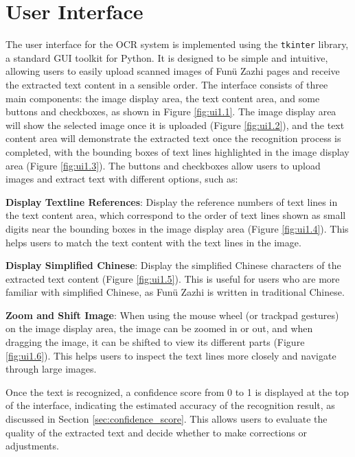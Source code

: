 \documentclass[12pt,twoside]{report}
\begin{document}
\section{User Interface}
\label{sec:user_interface}
The user interface for the OCR system is implemented using the \texttt{tkinter} library, a standard GUI toolkit for Python. It is designed to be simple and intuitive, allowing users to easily upload scanned images of Funü Zazhi pages and receive the extracted text content in a sensible order. The interface consists of three main components: the image display area, the text content area, and some buttons and checkboxes, as shown in Figure \ref{fig:ui1.1}. The image display area will show the selected image once it is uploaded (Figure \ref{fig:ui1.2}), and the text content area will demonstrate the extracted text once the recognition process is completed, with the bounding boxes of text lines highlighted in the image display area (Figure \ref{fig:ui1.3}). The buttons and checkboxes allow users to upload images and extract text with different options, such as:

\textbf{Display Textline References}: Display the reference numbers of text lines in the text content area, which correspond to the order of text lines shown as small digits near the bounding boxes in the image display area (Figure \ref{fig:ui1.4}). This helps users to match the text content with the text lines in the image.

\textbf{Display Simplified Chinese}: Display the simplified Chinese characters of the extracted text content (Figure \ref{fig:ui1.5}). This is useful for users who are more familiar with simplified Chinese, as Funü Zazhi is written in traditional Chinese.

\textbf{Zoom and Shift Image}: When using the mouse wheel (or trackpad gestures) on the image display area, the image can be zoomed in or out, and when dragging the image, it can be shifted to view its different parts (Figure \ref{fig:ui1.6}). This helps users to inspect the text lines more closely and navigate through large images.

Once the text is recognized, a confidence score from 0 to 1 is displayed at the top of the interface, indicating the estimated accuracy of the recognition result, as discussed in Section \ref{sec:confidence_score}. This allows users to evaluate the quality of the extracted text and decide whether to make corrections or adjustments.
\end{document}
